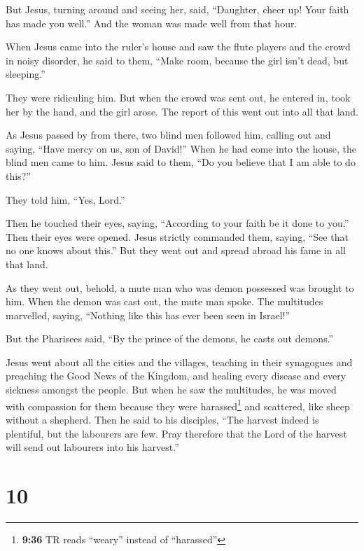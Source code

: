  But Jesus, turning around and seeing her, said,
``Daughter, cheer up! Your faith has made you well.'' And the woman was
made well from that hour.

 When Jesus came into the ruler's house and saw the flute
players and the crowd in noisy disorder,  he said to
them, ``Make room, because the girl isn't dead, but sleeping.''

They were ridiculing him.  But when the crowd was sent
out, he entered in, took her by the hand, and the girl arose.
 The report of this went out into all that land.

 As Jesus passed by from there, two blind men followed
him, calling out and saying, ``Have mercy on us, son of David!''
 When he had come into the house, the blind men came to
him. Jesus said to them, ``Do you believe that I am able to do this?''

They told him, ``Yes, Lord.''

 Then he touched their eyes, saying, ``According to your
faith be it done to you.''  Then their eyes were opened.
Jesus strictly commanded them, saying, ``See that no one knows about
this.''  But they went out and spread abroad his fame in
all that land.

 As they went out, behold, a mute man who was demon
possessed was brought to him.  When the demon was cast
out, the mute man spoke. The multitudes marvelled, saying, ``Nothing
like this has ever been seen in Israel!''

 But the Pharisees said, ``By the prince of the demons,
he casts out demons.''

 Jesus went about all the cities and the villages,
teaching in their synagogues and preaching the Good News of the Kingdom,
and healing every disease and every sickness amongst the people.
 But when he saw the multitudes, he was moved with
compassion for them because they were harassed\footnote{\textbf{9:36} TR
  reads ``weary'' instead of ``harassed''} and scattered, like sheep
without a shepherd.  Then he said to his disciples, ``The
harvest indeed is plentiful, but the labourers are few. 
Pray therefore that the Lord of the harvest will send out labourers into
his harvest.''

\hypertarget{section-9}{%
\section{10}\label{section-9}}

